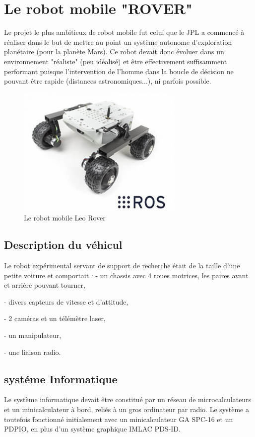\section{Le robot mobile "ROVER"}
Le projet le plus ambitieux de robot mobile fut celui que le JPL a commencé à réaliser dans le but de mettre au point un système autonome d'exploration planétaire (pour la planète Mars). Ce robot devait donc évoluer dans un environnement "réaliste" (peu idéalisé) et être effectivement suffisamment performant puisque l'intervention de l'homme dans la boucle de décision ne pouvant être rapide (distances astronomiques...), ni parfois possible.
\begin{figure}[h]
    \centering
    \includegraphics[width=8cm]{assets/Chapter2/rover.png}
    \caption{Le robot mobile Leo Rover }
    \label{roverbot}

\end{figure}

\newpage
\subsection{Description du véhicul}
Le robot expérimental servant de support de recherche était de la taille d'une petite voiture et comportait :
- un chassis avec 4 roues motrices, les paires avant et arrière pouvant tourner,

- divers capteurs de vitesse et d'attitude,


- 2 caméras et un télémètre laser,


- un manipulateur,


- une liaison radio.
\subsection{systéme Informatique}
Le système informatique devait être constitué par un réseau de microcalculateurs et un minicalculateur à bord, reliés à un gros ordinateur par radio. Le système a toutefois fonctionné initialement avec un minicalculateur GA SPC-16 et un PDPIO, en plus d'un système graphique IMLAC PDS-ID.
